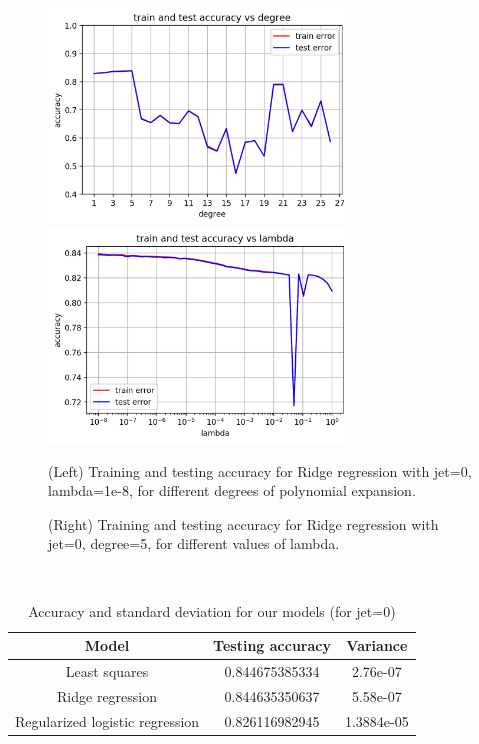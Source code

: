 \documentclass[a4paper]{article}
\begin{document}
\begin{figure}[h]
  \centering
  \includegraphics[width=8cm]{accuracy_vs_degree.png}
  \includegraphics[width=8cm]{accuracy_vs_lambda.png}
  \caption{(Left) Training and testing accuracy for Ridge regression with jet=0, lambda=1e-8, for different degrees of polynomial expansion.}
  \label{fig:figure 1}
  \caption{(Right) Training and testing accuracy for Ridge regression with jet=0, degree=5, for different values of lambda.}
  \label{fig:figure 2}
\end{figure}

\mbox{}\\

\begin{table}[h!]
  \centering
  \begin{tabular}{|c|c|c|}
    \hline
    \textbf{Model} & \textbf{Testing accuracy} & \textbf{Variance}\\
    \hline
    Least squares & 0.844675385334 & 2.76e-07\\
    \hline
    Ridge regression & 0.844635350637 & 5.58e-07\\
    \hline
    Regularized logistic regression & 0.826116982945 & 1.3884e-05\\
    \hline
  \end{tabular}
  \caption{Accuracy and standard deviation for our models (for jet=0)}
  \label{tab:table 1}
\end{table}
\end{document}

